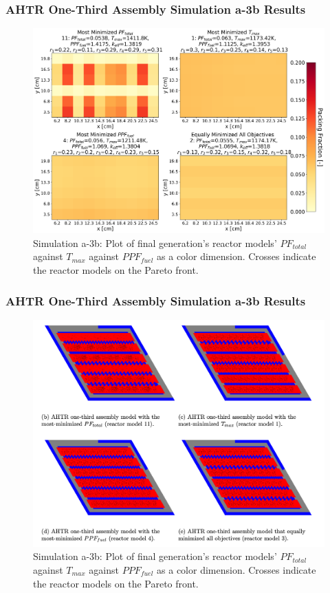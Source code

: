 \begin{frame}
    \frametitle{AHTR One-Third Assembly Simulation a-3b Results}
    \begin{figure}
        \includegraphics[width=0.8\linewidth]{../docs/figures/assem-obj-3-all-distr-most-minimized.png} 
        \caption{Simulation a-3b: Plot of final generation's reactor models' 
        $PF_{total}$ against $T_{max}$ against $PPF_{fuel}$ as a color dimension. 
        Crosses indicate the reactor models on the Pareto front.}
    \end{figure}
\end{frame}

\begin{frame}
    \frametitle{AHTR One-Third Assembly Simulation a-3b Results}
    \begin{figure}
        \includegraphics[width=0.8\linewidth]{figures/assem-obj-3.png} 
        \caption{Simulation a-3b: Plot of final generation's reactor models' 
        $PF_{total}$ against $T_{max}$ against $PPF_{fuel}$ as a color dimension. 
        Crosses indicate the reactor models on the Pareto front.}
    \end{figure}
\end{frame}

